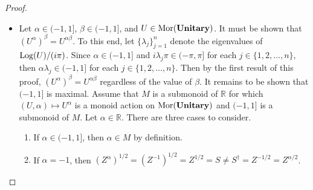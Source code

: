 \begin{proof}
\begin{itemize}
          Since $j$ was arbitrary, then $( U^\alpha )^\beta = U^{\alpha\beta}$.
          Since $\alpha$, $\beta$, and $U$ were arbitrary, then $( U, \alpha ) \mapsto U^\alpha$ is a monoid action on $\Mor( \CatUnitary )$ with respect to $\mathbb{Z}$.
          It remains to be shown that $\mathbb{Z}$ is maximal.
          Assume that $M$ is a submonoid of $\mathbb{R}$ for which $( U, \alpha ) \mapsto U^\alpha$ is a monoid action on $\Mor( \CatUnitary )$ and $\mathbb{Z}$ is a submonoid of $M$.
          Let $\beta \in M$.
          Then $( Z^2 )^\beta = Z^{2\beta}$ by definition of $M$.
          Since $\lambda = 1$ is an eigenvalue of $\Log( Z ) / (i\pi)$ and $2\lambda \not \in (-1,1]$, then it follows by the first result of this proof that $\beta \in \mathbb{Q}$.
          Then there exists some $q \in \mathbb{Z}$ and $d \in \mathbb{N}$ such that $\beta = q / d$ and $\gcd( q, d ) = 1$.
          Since $2d + 3 \in \mathbb{Z} \subseteq M$, then $( Z^{2d + 3} )^\beta = Z^{\beta(2d+3)}$ by definition of $M$.
          Since $\lambda = 1$ is an eigenvalue of $\Log( Z ) / (i\pi)$ and $(2d+3) \not \in (-1,1]$, then by the first result of this proof $d$ divides $\ceil{((2d+3)-1)/2} = d + 1$.
          This is only possible when $d = 1$.
          Then $\beta = q / d = q \in \mathbb{Z}$.
          Since $\beta$ was arbitrary, then $M \subseteq \mathbb{Z}$.
          In conclusion, $\mathbb{Z}$ is maximal.
    \item Let $\alpha \in ( -1, 1 ]$, $\beta \in ( -1, 1 ]$, and $U \in \operatorname{Mor}( \mathbf{Unitary} )$.
          It must be shown that $( U^\alpha )^\beta = U^{\alpha\beta}$.
          To this end, let $\{ \lambda_j \}_{j=1}^n$ denote the eigenvalues of $\operatorname{Log}( U ) / (i\pi)$.
          Since $\alpha \in ( -1, 1 ]$ and $i\lambda_j\pi \in ( -\pi, \pi ]$ for each $j \in \{ 1, 2, \ldots, n \}$, then $\alpha\lambda_j \in ( -1, 1 ]$ for each $j \in \{ 1, 2, \ldots, n \}$.
          Then by the first result of this proof, $( U^\alpha )^\beta = U^{\alpha\beta}$ regardless of the value of $\beta$.
          It remains to be shown that $( -1, 1 ]$ is maximal.
          Assume that $M$ is a submonoid of $\mathbb{R}$ for which $( U, \alpha ) \mapsto U^\alpha$ is a monoid action on $\Mor( \CatUnitary )$ and $( -1, 1 ]$ is a submonoid of $M$.
          Let $\alpha \in \mathbb{R}$.
          There are three cases to consider.
          \begin{enumerate}
          \item If $\alpha \in ( -1, 1 ]$, then $\alpha \in M$ by definition.
          \item If $\alpha = -1$, then $( Z^{\alpha} )^{1/2} = ( Z^{-1} )^{1/2} = Z^{1/2} = S \ne S^\dagger = Z^{-1/2} = Z^{\alpha/2}$.

\end{enumerate}
\end{itemize}
\end{proof}
